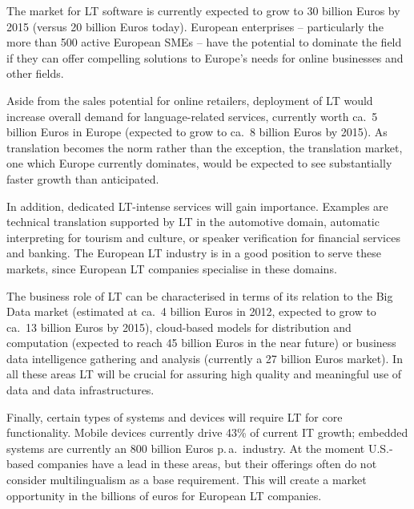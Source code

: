 \documentclass[10pt, plain]{../../metanetpaper}
\begin{document}
\begin{multicols}{2}
The market for LT software is currently expected to grow to 30 billion Euros by 2015 (versus 20 billion Euros today). European enterprises -- particularly the more than 500 active European SMEs -- have the potential to dominate the field if they can offer compelling solutions to Europe’s needs for online businesses and other fields.

Aside from the sales potential for online retailers, deployment of LT would increase overall demand for language-related services, currently worth ca.~5 billion Euros in Europe (expected to grow to ca.~8 billion Euros by 2015). As translation becomes the norm rather than the exception, the translation market, one which Europe currently dominates, would be expected to see substantially faster growth than anticipated.

In addition, dedicated LT-intense services will gain importance. Examples are technical translation supported by LT in the automotive domain, automatic interpreting for tourism and culture, or speaker verification for financial services and banking. The European LT industry is in a good position to serve these markets, since European LT companies specialise in these domains. 

The business role of LT can be characterised in terms of its relation to the Big Data market (estimated at ca.~4 billion Euros in 2012, expected to grow to ca.~13 billion Euros by 2015), cloud-based models for distribution and computation (expected to reach 45 billion Euros in the near future) or business data intelligence gathering and analysis (currently a 27 billion Euros market). In all these areas LT will be crucial for assuring high quality and meaningful use of data and data infrastructures. 

Finally, certain types of systems and devices will require LT for core functionality. Mobile devices currently drive 43\% of current IT growth; embedded systems are currently an 800 billion Euros p.\,a.~industry. At the moment U.S.-based companies have a lead in these areas, but their offerings often do not consider multilingualism as a base requirement. This will create a market opportunity in the billions of euros for European LT companies.
\end{multicols}

\clearpage


\end{document}

